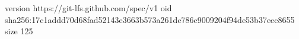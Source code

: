 version https://git-lfs.github.com/spec/v1
oid sha256:17c1addd70d68fad52143e3663b573a261de786c9009204f94de53b37eec8655
size 125

